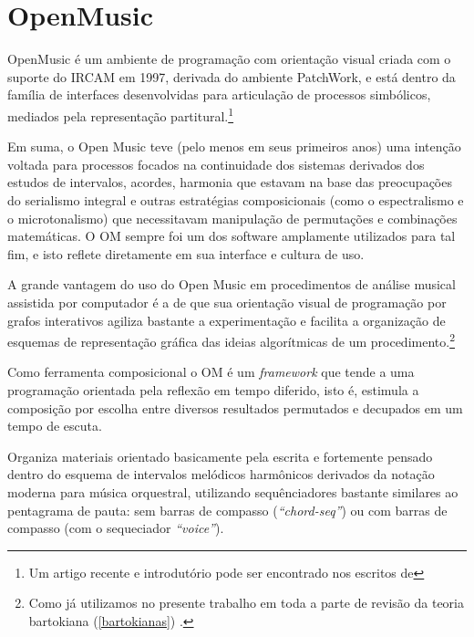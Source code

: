 \documentclass[
	12pt,				%
	openright,			%
	twoside,			%
	a4paper,			%
	english,			%
	french,				%
	spanish,			%
	brazil				%
	]{abntex2}
\begin{document}



\pagebreak
\section{OpenMusic}

OpenMusic é um ambiente de programação com orientação visual criada com o suporte do IRCAM em 1997, derivada do ambiente PatchWork, e está dentro da família de interfaces desenvolvidas para articulação de processos simbólicos, mediados pela representação partitural.\footnote{Um artigo recente e introdutório pode ser encontrado nos escritos de }

Em suma, o Open Music teve (pelo menos em seus primeiros anos) uma intenção voltada para processos focados na continuidade dos sistemas derivados dos estudos de intervalos, acordes, harmonia que estavam na base das preocupações do serialismo integral e outras estratégias composicionais (como o espectralismo e o microtonalismo) que necessitavam manipulação de permutações e combinações matemáticas. O OM sempre foi um dos software amplamente utilizados para tal fim, e isto reflete diretamente em sua interface e cultura de uso.

A grande vantagem do uso do Open Music em procedimentos de análise musical assistida por computador é a de que sua orientação visual de programação por grafos interativos agiliza bastante a experimentação e facilita a organização de esquemas de representação gráfica das ideias algorítmicas de um procedimento.\footnote{Como já utilizamos no presente trabalho em toda a parte de revisão da teoria bartokiana (\autoref{bartokianas})  .} 

Como ferramenta composicional o OM é um \textit{framework} que tende a uma programação orientada pela reflexão em tempo diferido, isto é, estimula a composição por escolha entre diversos resultados permutados e decupados em um tempo de escuta.

Organiza materiais orientado basicamente pela escrita e fortemente pensado dentro do esquema de intervalos melódicos harmônicos derivados da notação moderna para música orquestral, utilizando sequênciadores bastante similares ao pentagrama de pauta: sem barras de compasso (\textit{“chord-seq”}) ou com barras de compasso (com o sequeciador \textit{“voice”}).
\end{document}
